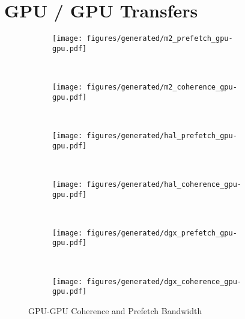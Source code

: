 \section{GPU / GPU Transfers}
\label{sec:um-gpu-gpu}

\begin{figure}[ht]
    \centering
    \begin{subfigure}[b]{0.45\textwidth}
        \texttt{[image: figures/generated/m2\_prefetch\_gpu-gpu.pdf]}
        \caption{}
        \label{fig:um-prefetch-s822lc-gpu-gpu}
    \end{subfigure}
    ~
    \begin{subfigure}[b]{0.45\textwidth}
        \texttt{[image: figures/generated/m2\_coherence\_gpu-gpu.pdf]}
        \caption{}
        \label{fig:um-coherence-s822lc-gpu-gpu}
    \end{subfigure}
    \\
    \begin{subfigure}[b]{0.45\textwidth}
        \texttt{[image: figures/generated/hal\_prefetch\_gpu-gpu.pdf]}
        \caption{}
        \label{fig:um-prefetch-ac922-gpu-gpu}
    \end{subfigure}
    ~
    \begin{subfigure}[b]{0.45\textwidth}
        \texttt{[image: figures/generated/hal\_coherence\_gpu-gpu.pdf]}
        \caption{}
        \label{fig:um-coherence-ac922-gpu-gpu}
    \end{subfigure}
    \\
    \begin{subfigure}[b]{0.45\textwidth}
        \texttt{[image: figures/generated/dgx\_prefetch\_gpu-gpu.pdf]}
        \caption{}
        \label{fig:um-prefetch-dgx-gpu-gpu}
    \end{subfigure}
    ~
    \begin{subfigure}[b]{0.45\textwidth}
        \texttt{[image: figures/generated/dgx\_coherence\_gpu-gpu.pdf]}
        \caption{}
        \label{fig:um-coherence-dgx-gpu-gpu}
    \end{subfigure}
    \caption[]{
        GPU-GPU Coherence and Prefetch Bandwidth
    }
    \label{fig:um-coherence-gpu-gpu}
\end{figure}




